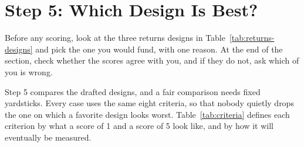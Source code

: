 
\section{Step 5: Which Design Is Best?}
\label{sec:criteria}

\begin{thinkabout}
Before any scoring, look at the three returns designs in Table~\ref{tab:returns-designs} and pick the one you would fund, with one reason. At the end of the section, check whether the scores agree with you, and if they do not, ask which of you is wrong.
\end{thinkabout}

Step 5 compares the drafted designs, and a fair comparison needs fixed yardsticks. Every case uses the same eight criteria, so that nobody quietly drops the one on which a favorite design looks worst. Table~\ref{tab:criteria} defines each criterion by what a score of 1 and a score of 5 look like, and by how it will eventually be measured.

